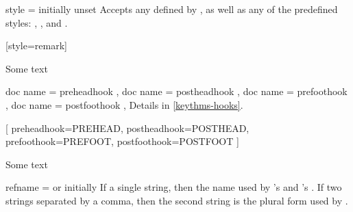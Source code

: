 \documentclass{ltxdoc}
\begin{document}
\begin{docKey}{style}
  {=}
  {initially unset}
Accepts any  defined by , as well as any of the predefined  styles: , , and .

\begin{tcbwritetemp}
[style=remark]
\end{tcbwritetemp}

\begin{keythmscode}[withpreamble]
\begin{remark}
Some text
\end{remark}
\end{keythmscode}

\end{docKey}

\begin{docKeys}[
  doc parameter = {=\meta{code}},
  doc description = initially unset,
  ]
  {
    { doc name = preheadhook },
    { doc name = postheadhook },
    { doc name = prefoothook },
    { doc name = postfoothook },
  }
Details in \autoref{keythms-hooks}.

\begin{tcbwritetemp}
[
  preheadhook=PREHEAD,
  postheadhook=POSTHEAD,
  prefoothook=PREFOOT,
  postfoothook=POSTFOOT
]
\end{tcbwritetemp}

\begin{keythmscode}[withpreamble]
\begin{test}
Some text
\end{test}
\end{keythmscode}

\end{docKeys}

\begin{docKey}{refname}
  {= \textrm{or} }
  {initially }
If a single string, then the name used by 's  and 's . If two strings separated by a comma, then the second string is the plural form used by .
\end{docKey}
\end{document}
